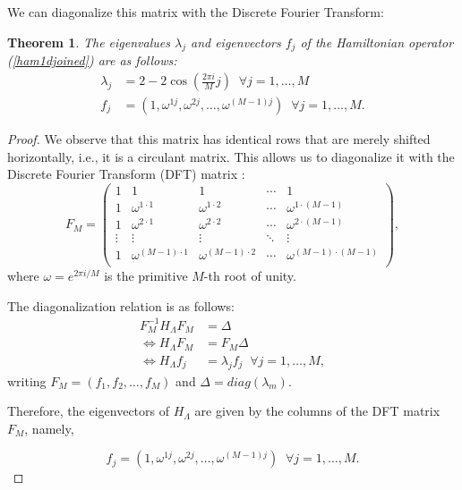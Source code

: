 \documentclass{article}
\newtheorem{theorem}{Theorem}
\newcommand{\hl}{H_\Lambda}
\numberwithin{equation}{section}
\numberwithin{theorem}{section}
\numberwithin{proposition}{section}
\numberwithin{lemma}{section}
\numberwithin{corollary}{section}
\numberwithin{definition}{section}
\begin{document}
We can diagonalize this matrix with the Discrete Fourier Transform:

\begin{theorem}
	The eigenvalues $\lambda_j$ and eigenvectors $f_j$ of the Hamiltonian operator (\ref{ham1djoined}) are as follows:
	\begin{align}
	\lambda_j &= 2 -2\cos\left(\frac{2\pi i}{M} j\right) \; \; \forall j = 1, \ldots , M \\
	f_j &= (1, \omega^{1 j}, \omega^{2  j}, \ldots, \omega^{(M-1)  j}) \; \; \forall j = 1, \ldots , M.
	\end{align}
\end{theorem}


\begin{proof}	
We observe that this matrix has identical rows that are merely shifted horizontally, i.e., it is a circulant matrix. This allows us to diagonalize it with the Discrete Fourier Transform (DFT) matrix \cite{fenglinetsky}:
	\[
F_M = \left(
	\begin{array}{ccccc}
			1 & 1 & 1 & \cdots & 1 \\
			1 & \omega^{1 \cdot 1} & \omega^{1 \cdot 2} & \cdots & \omega^{1 \cdot (M-1)} \\
			1 & \omega^{2 \cdot 1} & \omega^{2 \cdot 2} & \cdots & \omega^{2 \cdot (M-1)} \\
			\vdots & \vdots & \vdots & \ddots \ & \vdots \\
			1 & \omega^{(M-1) \cdot 1} & \omega^{(M-1) \cdot 2} & \cdots & \omega^{(M-1) \cdot (M-1)} \\
	\end{array}
\right) ,
\]
where $\omega = e^{2 \pi i / M}$ is the primitive $M$-th root of unity.

The diagonalization relation is as follows:
\begin{align*}
	F_M^{-1}\hl F_M &= \Delta
	\\ \Leftrightarrow \hl F_M &= F_M\Delta
	\\ \Leftrightarrow \hl f_j &= \lambda_j f_j \; \; \forall j = 1, \ldots , M,
\end{align*}
writing $F_M = (f_1, f_2, \ldots, f_M)$ and $\Delta = diag(\lambda_m)$.

Therefore, the eigenvectors of $\hl$ are given by the columns of the DFT matrix $F_M$, namely,

\[
f_j = (1, \omega^{1  j}, \omega^{2  j}, \ldots, \omega^{(M-1)  j}) \; \; \forall j = 1, \ldots , M.
\]


\end{proof}
\end{document}
